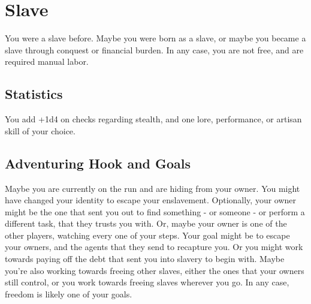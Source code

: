 \section{Slave}\label{background:slave}
You were a slave before. 
Maybe you were born as a slave, or maybe you became a slave through conquest or financial burden.
In any case, you are not free, and are required manual labor.

\subsection{Statistics}
You add +1d4 on checks regarding stealth, and one lore, performance, or artisan skill of your choice.

\subsection{Adventuring Hook and Goals}
Maybe you are currently on the run and are hiding from your owner.
You might have changed your identity to escape your enslavement.
Optionally, your owner might be the one that sent you out to find something -  or someone - or perform a different task, that they trusts you with.
Or, maybe your owner is one of the other players, watching every one of your steps.
Your goal might be to escape your owners, and the agents that they send to recapture you.
Or you might work towards paying off the debt that sent you into slavery to begin with.
Maybe you're also working towards freeing other slaves, either the ones that your owners still control, or you work towards freeing slaves wherever you go.
In any case, freedom is likely one of your goals.